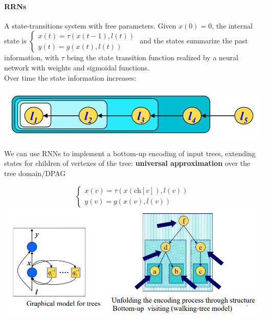 \documentclass[10pt]{report}
\begin{document}
\paragraph{RRNs} A state-transitions system with free parameters. Given $x(0) = 0$, the internal state is $\left\{\begin{array}{l}
x(t)=\tau(x(t-1),l(t))\\
y(t)=g(x(t),l(t))
\end{array}\right.$ and the states summarize the past information, with $\tau$ being the state transition function realized by a neural network with weights and sigmoidal functions.\\
Over time the state information increases:
\begin{center}
	\includegraphics[scale=0.75]{41.png}
\end{center}
We can use RNNs to implement a bottom-up encoding of input trees, extending states for children of vertexes of the tree: \textbf{universal approximation} over the tree domain/DPAG
\begin{center}
	$$\left\{\begin{array}{l}
x(v)=\tau(x(\text{ch}[v]),l(v))\\
y(v)=g(x(v),l(v))
\end{array}\right.$$
	\includegraphics[scale=0.7]{42.png}
\end{center}
\end{document}
